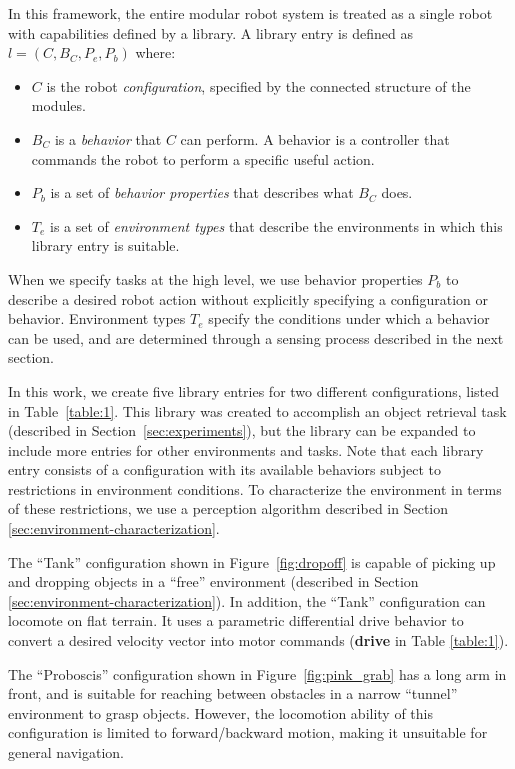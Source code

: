 \documentclass[conference]{IEEEtran}
\begin{document}
In this framework, the entire modular robot system is treated as a single robot with capabilities defined by a library. A library entry is defined as $l = (C,B_C,P_e,P_b)$ where:
\begin{itemize}
\item $C$ is the robot \emph{configuration}, specified by the connected structure of the modules.
\item $B_C$ is a \emph{behavior} that $C$ can perform. A behavior is a controller that commands the robot to perform a specific useful action. 
\item $P_b$ is a set of \emph{behavior properties} that describes what $B_C$ does. 
\item $T_e$ is a set of \emph{environment types} that describe the environments in which this library entry is suitable. 
\end{itemize} 
%
When we specify tasks at the high level, we use behavior properties $P_b$ to describe a desired robot action without explicitly specifying a configuration or behavior.
Environment types $T_e$ specify the conditions under which a behavior can be used, and are determined through a sensing process described in the next section.
 
In this work, we create five library entries for two different configurations,
listed in Table~\ref{table:1}. This library was created to accomplish an object retrieval task (described in Section~\ref{sec:experiments}), but the library can be expanded to include more entries for other environments and tasks. Note that each library entry consists of a configuration with its available behaviors subject to restrictions in environment conditions. To characterize the environment in terms of these restrictions, we use a perception algorithm described in Section \ref{sec:environment-characterization}.

The ``Tank'' configuration shown in Figure~\ref{fig:dropoff} is capable of picking
up and dropping objects in a ``free'' environment (described in Section \ref{sec:environment-characterization}). In addition, the ``Tank'' configuration can locomote on flat terrain. It uses a parametric differential drive behavior to convert a desired velocity vector into motor commands (\textbf{drive} in Table \ref{table:1}).

The ``Proboscis'' configuration shown in Figure~\ref{fig:pink_grab} has
a long arm in front, and is suitable for reaching between obstacles in a narrow ``tunnel'' environment to grasp objects.
However, the locomotion ability of this configuration is limited to forward/backward
motion, making it unsuitable for general navigation.
\end{document}
